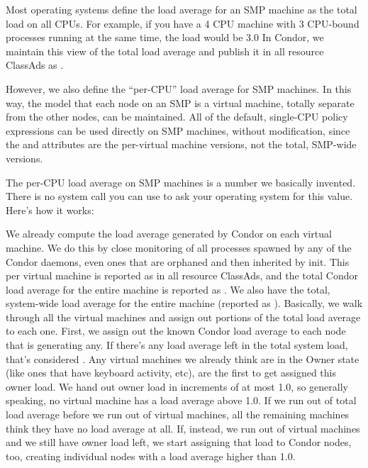 Most operating systems define the load average for an SMP machine as
the total load on all CPUs.
For example, if you have a 4 CPU machine with 3 CPU-bound processes
running at the same time, the load would be 3.0
In Condor, we maintain this view of the total load average and publish
it in all resource ClassAds as .

However, we also define the ``per-CPU'' load average for SMP machines.
In this way, the model that each node on an SMP is a virtual machine,
totally separate from the other nodes, can be maintained.
All of the default, single-CPU policy expressions can be used directly
on SMP machines, without modification, since the  and
 attributes are the per-virtual machine versions,
not the total, SMP-wide versions.

The per-CPU load average on SMP machines is a number we basically
invented. 
There is no system call you can use to ask your operating system for
this value.
Here's how it works:

We already compute the load average generated by Condor on each
virtual machine.
We do this by close monitoring of all processes spawned by any of the
Condor daemons, even ones that are orphaned and then inherited by
init. 
This  per virtual machine is reported as
 in all resource ClassAds, and the total Condor
load average for the entire machine is reported as
. 
We also have the total, system-wide load average for the entire
machine (reported as ).
Basically, we walk through all the virtual machines and assign out
portions of the total load average to each one. 
First, we assign out the known Condor load average to each node that
is generating any.  
If there's any load average left in the total system load, that's
considered .
Any virtual machines we already think are in the Owner state (like
ones that have keyboard activity, etc), are the first to get assigned
this owner load.
We hand out owner load in increments of at most 1.0, so generally
speaking, no virtual machine has a load average above 1.0.
If we run out of total load average before we run out of virtual
machines, all the remaining machines think they have no load average
at all.
If, instead, we run out of virtual machines and we still have owner
load left, we start assigning that load to Condor nodes, too, creating
individual nodes with a load average higher than 1.0.


